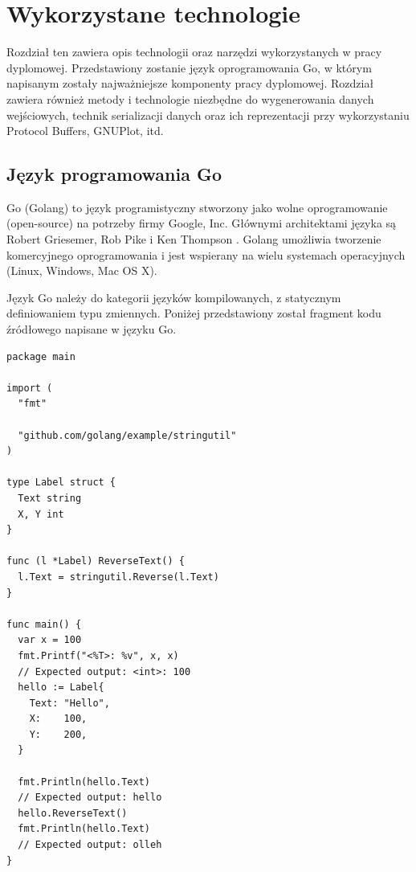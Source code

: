 \documentclass[a4paper,12pt,twoside,openany]{report}
\begin{document}


\chapter{Wykorzystane technologie}

Rozdział ten zawiera opis technologii oraz narzędzi wykorzystanych w pracy dyplomowej. 
Przedstawiony zostanie język oprogramowania Go, w którym napisanym zostały najważniejsze komponenty pracy dyplomowej. Rozdział zawiera również
metody i technologie niezbędne do wygenerowania danych wejściowych, technik serializacji danych oraz ich reprezentacji przy wykorzystaniu
Protocol Buffers, GNUPlot, itd.

\section{Język programowania Go}
Go (Golang) to język programistyczny stworzony jako wolne oprogramowanie (open-source) na potrzeby firmy Google, Inc. 
Głównymi architektami języka są Robert Griesemer, Rob Pike i Ken Thompson \cite{GolangBook}.
Golang umożliwia tworzenie komercyjnego oprogramowania i jest wspierany na wielu systemach operacyjnych (Linux, Windows, Mac OS X).

Język Go należy do kategorii języków kompilowanych, z statycznym definiowaniem typu zmiennych. 
Poniżej przedstawiony został fragment kodu źródłowego napisane w języku Go.

\begin{lstlisting}
package main

import (
  "fmt"

  "github.com/golang/example/stringutil"
)

type Label struct {
  Text string
  X, Y int
}

func (l *Label) ReverseText() {
  l.Text = stringutil.Reverse(l.Text)
}

func main() {
  var x = 100
  fmt.Printf("<%T>: %v", x, x)
  // Expected output: <int>: 100
  hello := Label{
    Text: "Hello",
    X:    100,
    Y:    200,
  }
  
  fmt.Println(hello.Text)
  // Expected output: hello
  hello.ReverseText()
  fmt.Println(hello.Text)
  // Expected output: olleh
}

\end{lstlisting}
\end{document}
